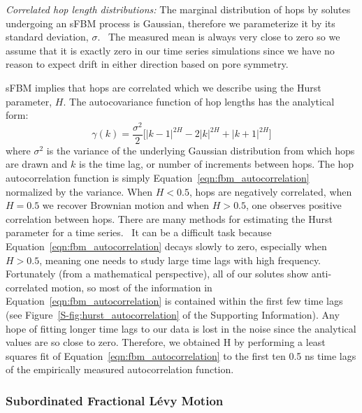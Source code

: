\documentclass[12pt]{article}
\begin{document}
  \textit{Correlated hop length distributions:} The marginal distribution of hops by solutes 
  undergoing an sFBM process is Gaussian, therefore we parameterize it by its standard deviation, 
  $\sigma$.~\cite{metzler_random_2000, metzler_anomalous_2014,neusius_subdiffusion_2009}
  The measured mean is always very close to zero so we assume that it is exactly zero
  in our time series simulations since we have no reason to expect drift in either direction
  based on pore symmetry.

  sFBM implies that hops are correlated which we describe using the Hurst parameter, $H$. 
  The autocovariance function of hop lengths has the analytical form:~\cite{mandelbrot_fractional_1968}
  \begin{equation}
    \gamma(k) = \dfrac{\sigma^2}{2}\bigg[|k-1|^{2H} - 2|k|^{2H} + |k+1|^{2H}\bigg]
  \label{eqn:fbm_autocorrelation}
  \end{equation}
  where $\sigma^2$ is the variance of the underlying Gaussian distribution from which hops are
  drawn and $k$ is the time lag, or number of increments between hops. The hop autocorrelation
  function is simply Equation~\ref{eqn:fbm_autocorrelation} normalized by the variance. 
  When $H < 0.5$, hops are negatively correlated, when $H = 0.5$ we recover Brownian motion
  and when $H > 0.5$, one observes positive correlation between hops. There are many methods
  for estimating the Hurst parameter for a time series.~\cite{clegg_practical_2006} It can
  be a difficult task because Equation~\ref{eqn:fbm_autocorrelation} decays slowly to zero, 
  especially when $H > 0.5$, meaning one needs to study large time lags with high frequency.
  Fortunately (from a mathematical perspective), all of our solutes show anti-correlated motion, so most of the information in
  Equation~\ref{eqn:fbm_autocorrelation} is contained within the first few time lags (see 
  Figure~\ref{S-fig:hurst_autocorrelation} of the Supporting Information). Any hope of
  fitting longer time lags to our data is lost in the noise since the analytical values
  are so close to zero. Therefore, we obtained H by performing a least squares fit of 
  Equation~\ref{eqn:fbm_autocorrelation} to the first 
  ten  
  0.5 ns time lags of the 
  empirically measured autocorrelation function.

  \subsubsection{Subordinated Fractional L\'evy Motion}\label{method:sflm}
\end{document}
